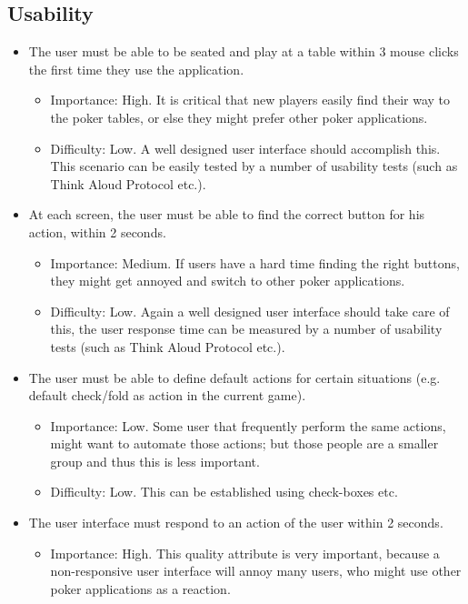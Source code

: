 \documentclass[a4paper,11pt]{report}
\begin{document}
\subsection{Usability}
\begin{itemize}
\item The user must be able to be seated and play at a table within 3 mouse clicks the first time they use
the application.
\begin{itemize}
\item Importance: High. It is critical that new players easily find their way to the poker tables, or else
they might prefer other poker applications.
\item Difficulty: Low. A well designed user interface should accomplish this. This scenario can be easily tested by a number of usability tests (such as Think Aloud Protocol etc.).
\end{itemize}
\item At each screen, the user must be able to find the correct button for his action, within 2 seconds.
\begin{itemize}
\item Importance: Medium. If users have a hard time finding the right buttons, they might get annoyed and 
switch to other poker applications.
\item Difficulty: Low. Again a well designed user interface should take care of this, the user response time can be measured by a number of usability tests (such as Think Aloud Protocol etc.).
\end{itemize}
\item The user must be able to define default actions for certain situations (e.g. default check/fold as action
in the current game).
\begin{itemize}
\item Importance: Low. Some user that frequently perform the same actions, might want to automate those actions;
but those people are a smaller group and thus this is less important.
\item Difficulty: Low. This can be established using check-boxes etc.
\end{itemize}
\item The user interface must respond to an action of the user within 2 seconds.
\begin{itemize}
\item Importance: High. This quality attribute is very important, because a non-responsive user interface
will annoy many users, who might use other poker applications as a reaction.

\end{itemize}
\end{itemize}
\end{document}
